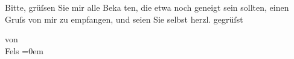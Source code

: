 \pstart
           
               Bitte, grüſsen Sie mir alle Beka
               {\geminationn}
               ten, die etwa noch
               geneigt sein sollten, einen Gruſs von mir zu empfangen, und seien Sie selbst herzl.
               gegrüſst
            \pend
           
\pstart
           
               von
               {\\[\baselineskip]}\spacefill\mbox{Fels}\pend
           \leftskip=0em{}\endnumbering{}  
      